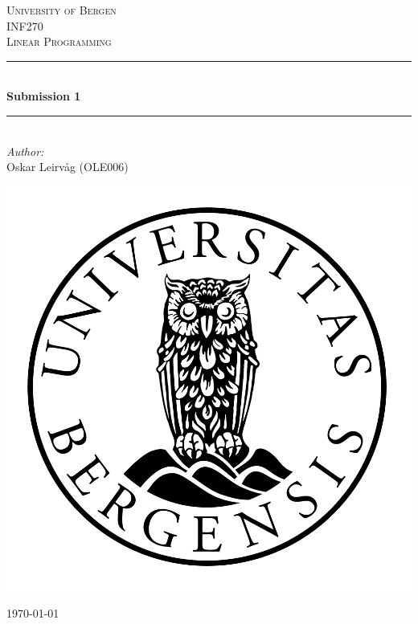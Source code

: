 \begin{titlepage}
    \newcommand{\HRule}{\rule{\linewidth}{0.5mm}}
    \center

    \textsc{\LARGE University of Bergen}\\[1.5cm] %
    \textsc{\Large INF270}\\[0.5cm] %
    \textsc{\large Linear Programming}\\[0.5cm] %

    \HRule \\[0.4cm]
    { \huge \bfseries Submission 1}\\[0.4cm] %
    \HRule \\[1.5cm]

    \Large \emph{Author:}\\
    Oskar Leirvåg (OLE006)
    \\[2cm] %

    \centerline{\includegraphics[scale=0.15]{figures/canvas}} %

    {\large \today}\\[3cm] %

    \vfill
\end{titlepage}
